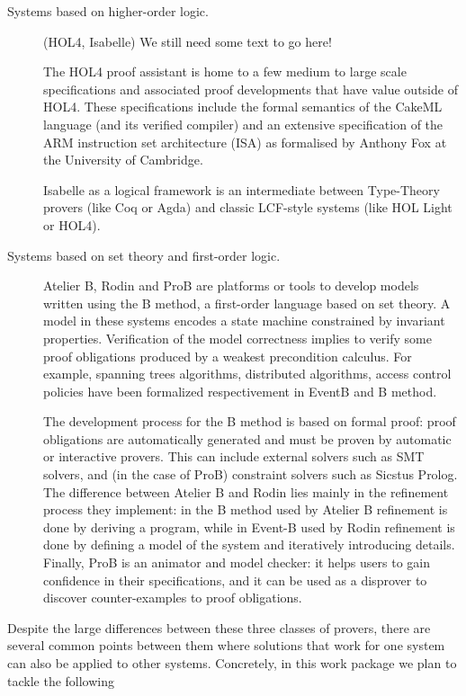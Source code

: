 \begin{description}
  \item[Systems based on higher-order logic.] (HOL4, Isabelle) We
  still need some text to go here!

  The HOL4 proof assistant is home to a few medium to large scale
  specifications and associated proof developments that have value
  outside of HOL4. These specifications include the formal semantics
  of the CakeML language (and its verified compiler) and an extensive
  specification of the ARM instruction set architecture (ISA) as
  formalised by Anthony Fox at the University of Cambridge.

  Isabelle as a logical framework \cite{paulson700} is an intermediate
  between Type-Theory provers (like Coq or Agda) and classic LCF-style
  systems (like HOL Light or HOL4).

  \item[Systems based on set theory and first-order logic.] Atelier B,
  Rodin and ProB are platforms or tools to develop models written
  using the B method, a first-order language based on set theory. A
  model in these systems encodes a state machine constrained by
  invariant properties. Verification of the model correctness implies
  to verify some proof obligations produced by a weakest precondition
  calculus. For example, spanning trees algorithms, distributed
  algorithms, access control policies have been formalized
  respectivement in EventB and B method.

  The development process for the B method is based on formal proof:
  proof obligations are automatically generated and must be proven by
  automatic or interactive provers. This can include external solvers
  such as SMT solvers, and (in the case of ProB) constraint solvers
  such as Sicstus Prolog. The difference between Atelier B and Rodin
  lies mainly in the refinement process they implement: in the B
  method used by Atelier B refinement is done by deriving a program,
  while in Event-B used by Rodin refinement is done by defining a
  model of the system and iteratively introducing details. Finally,
  ProB is an animator and model checker: it helps users to gain
  confidence in their specifications, and it can be used as a
  disprover to discover counter-examples to proof obligations.

\end{description}
Despite the large differences between these three classes of provers,
there are several common points between them where solutions that work
for one system can also be applied to other systems.
%
Concretely, in this work package we plan to tackle the following
